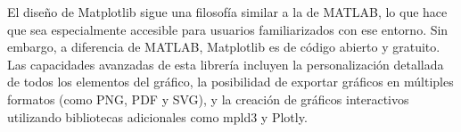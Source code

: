 El diseño de Matplotlib sigue una filosofía similar a la de MATLAB, lo que hace que sea especialmente accesible para usuarios familiarizados con ese entorno. Sin embargo, a diferencia de MATLAB, Matplotlib es de código abierto y gratuito. Las capacidades avanzadas de esta librería incluyen la personalización detallada de todos los elementos del gráfico, la posibilidad de exportar gráficos en múltiples formatos (como PNG, PDF y SVG), y la creación de gráficos interactivos utilizando bibliotecas adicionales como mpld3 y Plotly. 





